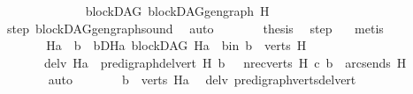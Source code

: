 \begin{isabellebody}
\ \ \ \ \isamarkupfalse%
\ {}\isanewline
\ \ \ \ \isamarkupfalse%
\ \isamarkupfalse%
\ {\isachardoublequoteopen}blockDAG\ {\isacharparenleft}{\kern0pt}blockDAG{\isachardot}{\kern0pt}gen{\isacharunderscore}{\kern0pt}graph\ H{\isacharparenright}{\kern0pt}{\isachardoublequoteclose}\ \isamarkupfalse%
\ step{\isacharparenleft}{\kern0pt}{}{\isacharparenright}{\kern0pt}\ blockDAG{\isachardot}{\kern0pt}gen{\isacharunderscore}{\kern0pt}graph{\isacharunderscore}{\kern0pt}sound\ \isamarkupfalse%
\ auto\isanewline
\ \ \ \ \isamarkupfalse%
\ \isamarkupfalse%
\ {\isacharquery}{\kern0pt}thesis\ \isamarkupfalse%
\ step{\isacharparenleft}{\kern0pt}{}{\isacharparenright}{\kern0pt}\ {}\ \isamarkupfalse%
\ metis\ \isanewline
\ \ \isamarkupfalse%
\isanewline
\ \ \ \ \isamarkupfalse%
\ {}\isanewline
\ \ \ \ \isamarkupfalse%
\ \isamarkupfalse%
\ Ha\ \ b\ \ bD{\isacharunderscore}{\kern0pt}Ha{\isacharcolon}{\kern0pt}\ {\isachardoublequoteopen}blockDAG\ Ha{\isachardoublequoteclose}\ \ b{\isacharunderscore}{\kern0pt}in{\isacharcolon}{\kern0pt}\ {\isachardoublequoteopen}b\ {\isasymin}\ verts\ H{\isachardoublequoteclose}\isanewline
\ \ \ \ \ \ \ del{\isacharunderscore}{\kern0pt}v{\isacharcolon}{\kern0pt}\ {\isachardoublequoteopen}Ha\ {\isacharequal}{\kern0pt}\ pre{\isacharunderscore}{\kern0pt}digraph{\isachardot}{\kern0pt}del{\isacharunderscore}{\kern0pt}vert\ H\ b\ {\isachardoublequoteclose}\ \ nre{\isacharcolon}{\kern0pt}{\isachardoublequoteopen}{\isacharparenleft}{\kern0pt}{\isasymforall}c{\isasymin}verts\ H{\isachardot}{\kern0pt}\ {\isacharparenleft}{\kern0pt}c{\isacharcomma}{\kern0pt}\ b{\isacharparenright}{\kern0pt}\ {\isasymnotin}\ {\isacharparenleft}{\kern0pt}arcs{\isacharunderscore}{\kern0pt}ends\ H{\isacharparenright}{\kern0pt}\isactrlsup {\isacharplus}{\kern0pt}{\isacharparenright}{\kern0pt}{\isachardoublequoteclose}\isanewline
\ \ \ \ \ \ \isamarkupfalse%
\ auto\isanewline
\ \ \ \ \isamarkupfalse%
\ \isamarkupfalse%
\ {\isachardoublequoteopen}b\ {\isasymnotin}\ verts\ Ha{\isachardoublequoteclose}\ \isamarkupfalse%
\ del{\isacharunderscore}{\kern0pt}v\ pre{\isacharunderscore}{\kern0pt}digraph{\isachardot}{\kern0pt}verts{\isacharunderscore}{\kern0pt}del{\isacharunderscore}{\kern0pt}vert\ \isamarkupfalse%

\end{isabellebody}

